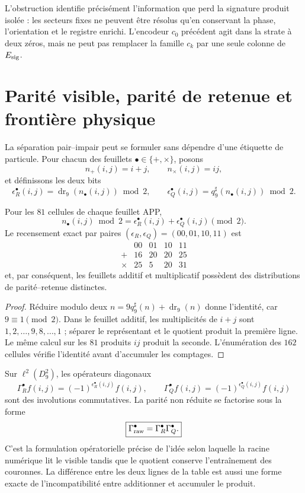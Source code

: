 L'obstruction identifie précisément l'information que perd la signature
produit isolée : les secteurs fixes ne peuvent être résolus qu'en conservant la phase,
l'orientation et le registre enrichi. L'encodeur \(c_0\) précédent agit dans
la strate à deux zéros, mais ne peut pas remplacer la famille \(c_k\) par une
seule colonne de \(E_{\rm sig}\).

\section{Parité visible, parité de retenue et frontière physique}

La séparation pair--impair peut se formuler sans dépendre d'une étiquette de
particule. Pour chacun des feuillets
\(\bullet\in\{+,\times\}\), posons
\[
 n_+(i,j)=i+j,
 \qquad
 n_\times(i,j)=ij,
\]
et définissons les deux bits
\[
 \epsilon_R^\bullet(i,j)
 =\operatorname{dr}_9(n_\bullet(i,j))\bmod2,
 \qquad
 \epsilon_Q^\bullet(i,j)
 =q_9^\sharp(n_\bullet(i,j))\bmod2.
\]

\begin{theorem}
\label{thm:factorizacion-paridad-acarreo}
Pour les \(81\) cellules de chaque feuillet APP,
\[
 \boxed{
 n_\bullet(i,j)\bmod2
 =\epsilon_R^\bullet(i,j)+\epsilon_Q^\bullet(i,j)\pmod2.}
\]
Le recensement exact par paires
\((\epsilon_R,\epsilon_Q)=(00,01,10,11)\) est
\[
 \begin{array}{c|rrrr}
  &00&01&10&11\\
 \hline
 +&16&20&20&25\\
 \times&25&5&20&31
 \end{array}
\]
et, par conséquent, les feuillets additif et multiplicatif possèdent des distributions de
parité--retenue distinctes.
\end{theorem}

\begin{proof}
Réduire modulo deux
\(n=9q_9^\sharp(n)+\operatorname{dr}_9(n)\) donne l'identité, car
\(9\equiv1\pmod2\). Dans le feuillet additif, les multiplicités de \(i+j\) sont
\(1,2,\ldots,9,8,\ldots,1\) ; séparer le représentant et le quotient produit la
première ligne. Le même calcul sur les \(81\) produits \(ij\) produit la
seconde. L'énumération des \(162\) cellules vérifie l'identité avant
d'accumuler les comptages.\qedhere
\end{proof}

Sur \(\ell^2(D_9^2)\), les opérateurs diagonaux
\[
 \Gamma_R^\bullet f(i,j)
 =(-1)^{\epsilon_R^\bullet(i,j)}f(i,j),
 \qquad
 \Gamma_Q^\bullet f(i,j)
 =(-1)^{\epsilon_Q^\bullet(i,j)}f(i,j)
\]
sont des involutions commutatives. La parité non réduite se factorise sous la forme
\[
 \boxed{\Gamma_{\rm raw}^\bullet
 =\Gamma_R^\bullet\Gamma_Q^\bullet.}
\]
C'est la formulation opératorielle précise de l'idée selon laquelle la racine numérique
lit le visible tandis que le quotient conserve l'entraînement des couronnes. La
différence entre les deux lignes de la table est aussi une forme exacte de
l'incompatibilité entre additionner et accumuler le produit.

